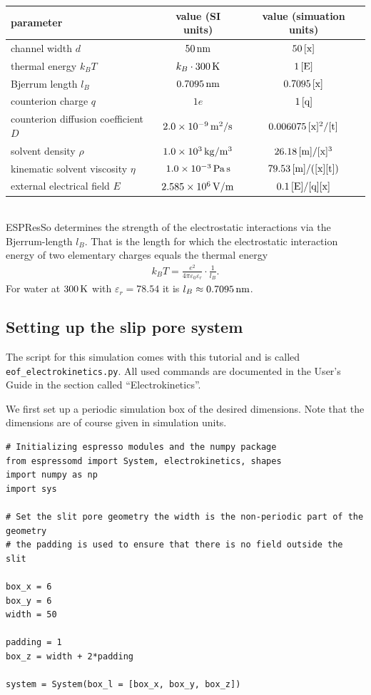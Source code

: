 \begin{tabular}[h]{|l|c|c|}
\hline
parameter & value (SI units) & value (simuation units)\\
\hline\hline
channel width $d$ & $50\U{nm}$ & $50\U{[x]}$\\
\hline
thermal energy $k_B T$ & $k_B\cdot300\U K$ & $1\U{[E]}$\\
\hline
Bjerrum length $l_B$ & $0.7095\U{nm}$ & $0.7095\U{[x]}$\\
\hline
counterion charge $q$ & $1e$ & $1\U{[q]}$\\
\hline
counterion diffusion coefficient $D$ & $2.0\E{-9}\U{m^2/s}$ & $0.006075\U{[x]^2/[t]}$\\
\hline
solvent density $\rho$ & $1.0\E{3}\U{kg/m^3}$ & $26.18\U{[m]/[x]^3}$\\
\hline
kinematic solvent viscosity $\eta$ & $1.0\E{-3}\U{Pa}\U{s}$ & $79.53\U{[m]/([x][t])}$\\
\hline
external electrical field $E$ & $2.585\E{6}\U{V/m}$ & $0.1\U{[E]/[q][x]}$\\
\hline
\end{tabular}
\\

ESPResSo determines the strength of the electrostatic interactions via the Bjerrum-length $l_B$. That is the length for which the electrostatic interaction energy of two elementary charges equals the thermal energy
%
\begin{align*}
k_B T=\frac{e^2}{4\pi\varepsilon_0\varepsilon_r}\cdot\frac 1 {l_B}.
\end{align*}
%
For water at $300\U{K}$ with $\varepsilon_r = 78.54$ it is $l_B\approx0.7095\U{nm}$.


\subsection{Setting up the slip pore system}

The script for this simulation comes with this tutorial and is called \texttt{eof\_electrokinetics.py}. All used commands are documented in the User's Guide in the section called ``Electrokinetics''.

We first set up a periodic simulation box of the desired dimensions. Note that the dimensions are of course given in simulation units.

\begin{lstlisting}
# Initializing espresso modules and the numpy package
from espressomd import System, electrokinetics, shapes
import numpy as np
import sys

# Set the slit pore geometry the width is the non-periodic part of the geometry
# the padding is used to ensure that there is no field outside the slit

box_x = 6
box_y = 6
width = 50

padding = 1
box_z = width + 2*padding

system = System(box_l = [box_x, box_y, box_z])
\end{lstlisting}

